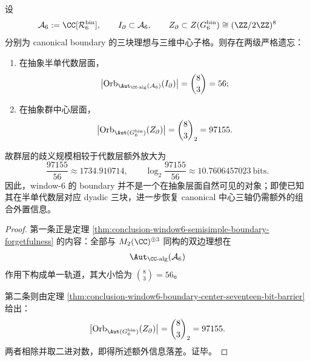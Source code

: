 \begin{theorem}\label{thm:conclusion-window6-boundary-double-forgetfulness-information-gap}
设
\[
\mathcal A_6:=\CC[\mathcal R_6^{\mathrm{bin}}],
\qquad
I_{\partial}\subset \mathcal A_6,
\qquad
Z_{\partial}\subset Z(G_6^{\mathrm{bin}})\cong (\ZZ/2\ZZ)^8
\]
分别为 canonical boundary 的三块理想与三维中心子格。则存在两级严格遗忘：
\begin{enumerate}
\normalfont
  \item 在抽象半单代数层面，
  \[
  \bigl|\operatorname{Orb}_{\Aut_{\CC\text{-alg}}(\mathcal A_6)}(I_{\partial})\bigr|
  =
  \binom{8}{3}
  =
  56;
  \]
  \item 在抽象群中心层面，
  \[
  \bigl|\operatorname{Orb}_{\Aut(G_6^{\mathrm{bin}})}(Z_{\partial})\bigr|
  =
  \binom{8}{3}_2
  =
  97155.
  \]
\end{enumerate}
故群层的歧义规模相较于代数层额外放大为
\[
\frac{97155}{56}\approx 1734.910714,
\qquad
\log_2\frac{97155}{56}\approx 10.7606457023\ \text{bits}.
\]
因此，window-\(6\) 的 boundary 并不是一个在抽象层面自然可见的对象；即使已知其在半单代数层对应 dyadic 三块，进一步恢复 canonical 中心三轴仍需额外的组合外置信息。
\end{theorem}
\begin{proof}
第一条正是定理 \ref{thm:conclusion-window6-semisimple-boundary-forgetfulness} 的内容：全部与 \(M_2(\CC)^{\oplus 3}\) 同构的双边理想在
\[
\Aut_{\CC\text{-alg}}(\mathcal A_6)
\]
作用下构成单一轨道，其大小恰为 \(\binom{8}{3}=56\)。

第二条则由定理 \ref{thm:conclusion-window6-boundary-center-seventeen-bit-barrier} 给出：
\[
\bigl|\operatorname{Orb}_{\Aut(G_6^{\mathrm{bin}})}(Z_{\partial})\bigr|
=
\binom{8}{3}_2
=
97155.
\]
两者相除并取二进对数，即得所述额外信息落差。证毕。
\end{proof}

